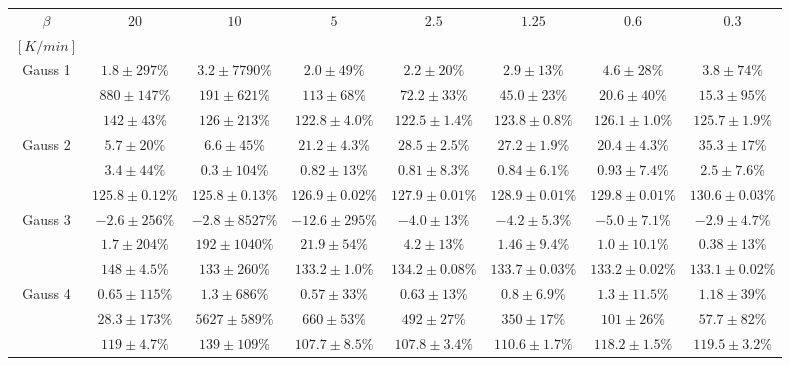 \documentclass{scrartcl}[12pt, halfparskip]
\numberwithin{equation}{section}
\numberwithin{figure}{section}
\numberwithin{table}{section}
\begin{document}
\newpage
\begin{landscape}
	


\begin{table}[H]
	\centering
	\begin{tabular}{| c | c | c | c | c | c | c | c |} \hline
		$\beta$ & $20$ & $10$ & $5$ & $2.5$ & $1.25$ & $0.6$ & $0.3$ \\ 
		$[K/min]$ & & & & & & & \\ \hline
		Gauss 1 & $1.8 \pm 297\%$ & $3.2 \pm 7790\%$ & $2.0 \pm 49\%$ & $2.2 \pm 20\%$ & $2.9 \pm 13\%$ & $4.6 \pm 28\%$ & $3.8 \pm 74\%$ \\
		& $880 \pm 147\%$ & $191 \pm 621\%$ & $113 \pm 68\%$ & $72.2 \pm 33\%$ & $45.0 \pm 23\%$ & $20.6 \pm 40\%$ & $15.3 \pm 95\%$ \\
		& $142 \pm 43\%$ & $126 \pm 213\%$ & $122.8 \pm 4.0\%$ & $122.5 \pm 1.4\%$ & $123.8 \pm 0.8\%$ & $126.1 \pm 1.0\%$ & $125.7 \pm 1.9\%$ \\ \hline
		Gauss 2 & $5.7 \pm 20\%$ & $6.6 \pm 45\%$ & $21.2 \pm 4.3\%$ & $28.5 \pm 2.5\%$ & $27.2 \pm 1.9\%$ & $20.4 \pm 4.3\%$ & $35.3 \pm 17\%$ \\
		& $3.4 \pm 44\%$ & $0.3 \pm 104\%$ & $0.82 \pm 13\%$ & $0.81 \pm 8.3\%$ & $0.84 \pm 6.1\%$ & $0.93 \pm 7.4\%$ & $2.5 \pm 7.6\%$ \\
		& $125.8 \pm 0.12\%$ & $125.8 \pm 0.13\%$ & $126.9 \pm 0.02\%$ & $127.9 \pm 0.01\%$ & $128.9 \pm 0.01\%$ & $129.8 \pm 0.01\%$ & $130.6 \pm 0.03\%$ \\ \hline
		Gauss 3 & $-2.6 \pm 256\%$ & $-2.8 \pm 8527\%$ & $-12.6 \pm 295\%$ & $-4.0 \pm 13\%$ & $-4.2 \pm 5.3\%$ & $-5.0 \pm 7.1\%$ & $-2.9 \pm 4.7\%$ \\
		& $1.7 \pm 204\%$ & $192 \pm 1040\%$ & $21.9 \pm 54\%$ & $4.2 \pm 13\%$ & $1.46 \pm 9.4\%$ & $1.0 \pm 10.1\%$ & $0.38 \pm 13\%$ \\
		& $148 \pm 4.5\%$ & $133 \pm 260\%$ & $133.2 \pm 1.0\%$ & $134.2 \pm 0.08\%$ & $133.7 \pm 0.03\%$ & $133.2 \pm 0.02\%$ & $133.1 \pm 0.02\%$ \\ \hline
		Gauss 4 & $0.65 \pm 115\%$ & $1.3 \pm 686\%$ & $0.57 \pm 33\%$ & $0.63 \pm 13\%$ & $0.8 \pm 6.9\%$ & $1.3 \pm 11.5\%$ & $1.18 \pm 39\%$ \\
		& $28.3 \pm 173\%$ & $5627 \pm 589\%$ & $660 \pm 53\%$ & $492 \pm 27\%$ & $350 \pm 17\%$ & $101 \pm 26\%$ & $57.7 \pm 82\%$ \\
		& $119 \pm 4.7\%$ & $139 \pm 109\%$ & $107.7 \pm 8.5\%$ & $107.8 \pm 3.4\%$ & $110.6 \pm 1.7\%$ & $118.2 \pm 1.5\%$ & $119.5 \pm 3.2\%$ \\ \hline

\end{tabular}
\end{table}
\end{landscape}
\end{document}
